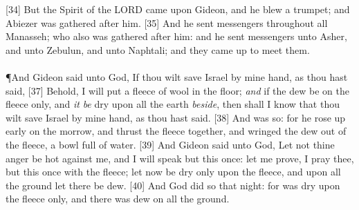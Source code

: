 [34] \textcolor[cmyk]{0.99998,1,0,0}{But the Spirit of the LORD came upon Gideon, and he blew a trumpet; and Abiezer was gathered after him.}
[35] \textcolor[cmyk]{0.99998,1,0,0}{And he sent messengers throughout all Manasseh; who also was gathered after him: and he sent messengers unto Asher, and unto Zebulun, and unto Naphtali; and they came up to meet them.}\\
\\
\P \textcolor[cmyk]{0.99998,1,0,0}{And Gideon said unto God, If thou wilt save Israel by mine hand, as thou hast said,}
[37] \textcolor[cmyk]{0.99998,1,0,0}{Behold, I will put a fleece of wool in the floor; \emph{and} if the dew be on the fleece only, and \emph{it} \emph{be} dry upon all the earth \emph{beside}, then shall I know that thou wilt save Israel by mine hand, as thou hast said.}
[38] \textcolor[cmyk]{0.99998,1,0,0}{And  was so: for he rose up early on the morrow, and thrust the fleece together, and wringed the dew out of the fleece, a bowl full of water.}
[39] \textcolor[cmyk]{0.99998,1,0,0}{And Gideon said unto God, Let not thine anger be hot against me, and I will speak but this once: let me prove, I pray thee, but this once with the fleece; let  now be dry only upon the fleece, and upon all the ground let there be dew.}
[40] \textcolor[cmyk]{0.99998,1,0,0}{And God did so that night: for  was dry upon the fleece only, and there was dew on all the ground.}